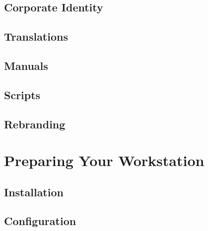 \documentclass[12pt]{book}
\begin{document}
\chapter{Corporate Identity}
   \hypertarget{cha:Concepts:Identity}{}
   \label{cha:Concepts:Identity}
   
   
   
   
   
   
   
   

\chapter{Translations}
   \hypertarget{cha:Concepts:Translations}{}
   \label{cha:Concepts:Translations}
   

\chapter{Manuals}
   \hypertarget{cha:Concepts:Manuals}{}
   \label{cha:Concepts:Manuals}
   

\chapter{Scripts}
   \hypertarget{cha:Concepts:Scripts}{}
   \label{cha:Concepts:Scripts}
   

\chapter{Rebranding}
   \hypertarget{cha:Concepts:rebranding}{}
   \label{cha:Concepts:rebranding}
   

\part{Preparing Your Workstation}

\chapter{Installation}
   \hypertarget{cha:Workstation:Installation}{}
   \label{cha:Workstation:Installation}
   

\chapter{Configuration}
   \hypertarget{cha:Workstation:Configuration}{}
   \label{cha:Workstation:Configuration}
   
\end{document}
